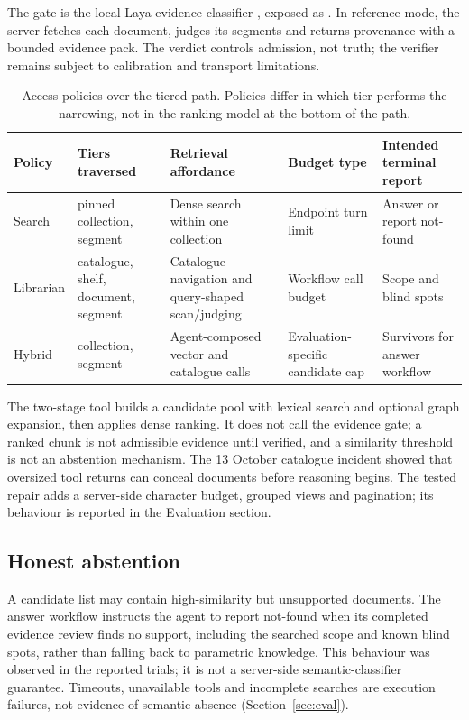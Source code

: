 The gate is the local Laya evidence classifier \cite{laya}, exposed as
. In reference mode, the server fetches each document,
judges its segments and returns provenance with a bounded evidence pack. The
verdict controls admission, not truth; the verifier remains subject to
calibration and transport limitations.

\begin{table}[t]
\centering
\small
\setlength{\tabcolsep}{5pt}
\caption{Access policies over the tiered path. Policies differ in which tier
performs the narrowing, not in the ranking model at the bottom of the path.}
\label{tab:lanes}
\begin{tabular}{@{}>{\raggedright\arraybackslash}p{}>{\raggedright\arraybackslash}p{}>{\raggedright\arraybackslash}p{}>{\raggedright\arraybackslash}p{}>{\raggedright\arraybackslash}p{}@{}}
\toprule
Policy & Tiers traversed & Retrieval affordance & Budget type & Intended terminal report\\
\midrule
Search & pinned collection, segment & Dense search within one collection & Endpoint turn limit & Answer or report not-found\\
Librarian & catalogue, shelf, document, segment & Catalogue navigation and query-shaped scan/judging & Workflow call budget & Scope and blind spots\\
Hybrid & collection, segment & Agent-composed vector and catalogue calls & Evaluation-specific candidate cap & Survivors for answer workflow\\
\bottomrule
\end{tabular}
\end{table}

The two-stage tool builds a candidate pool with lexical search and optional
graph expansion, then applies dense ranking. It does not call the
evidence gate; a ranked chunk is not admissible evidence until verified, and a
similarity threshold is not an abstention mechanism. The 13 October catalogue
incident showed that oversized tool returns can conceal documents before
reasoning begins. The tested repair adds a server-side character budget,
grouped views and pagination; its behaviour is reported in the Evaluation
section.

\subsection{Honest abstention}
A candidate list may contain high-similarity but unsupported documents. The
answer workflow instructs the agent to report not-found when its completed
evidence review finds no support, including the searched scope and known blind
spots, rather than falling back to parametric knowledge. This behaviour was
observed in the reported trials; it is not a server-side semantic-classifier
guarantee. Timeouts, unavailable tools and incomplete searches are execution
failures, not evidence of semantic absence (Section~\ref{sec:eval}).
